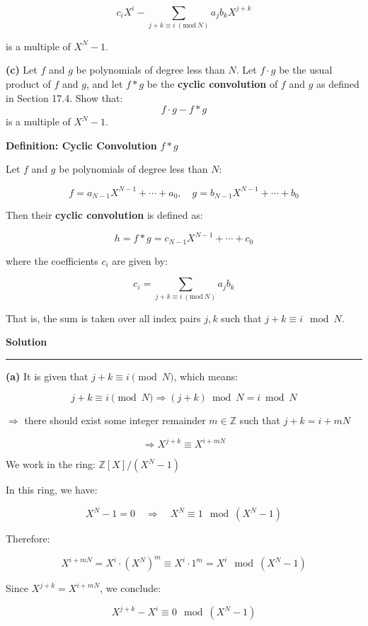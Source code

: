 \documentclass[a4paper,12pt]{article}
\begin{document}
\[
c_i X^i - \sum_{j + k \equiv i \ (\mathrm{mod}\ N)} a_j b_k X^{j + k}
\]

is a multiple of \(X^N - 1\).

\textbf{(c)} Let \(f\) and \(g\) be polynomials of degree less than
\(N\). Let \(f \cdot g\) be the usual product of \(f\) and \(g\), and
let \(f * g\) be the \textbf{cyclic convolution} of \(f\) and \(g\) as
defined in Section 17.4. Show that: \[
f \cdot g - f * g
\] is a multiple of \(X^N - 1\).

\textbf{Definition: Cyclic Convolution} \(f * g\)

Let \(f\) and \(g\) be polynomials of degree less than \(N\):

\[
f = a_{N-1} X^{N-1} + \cdots + a_0, \quad
g = b_{N-1} X^{N-1} + \cdots + b_0
\]

Then their \textbf{cyclic convolution} is defined as:

\[
h = f * g = c_{N-1} X^{N-1} + \cdots + c_0
\]

where the coefficients \(c_i\) are given by:

\[
c_i = \sum_{j + k \equiv i \ (\mathrm{mod}\ N)} a_j b_k
\]

That is, the sum is taken over all index pairs \(j, k\) such that
\(j + k \equiv i \mod N\).

    \textbf{Solution}

\begin{center}\rule{0.5\linewidth}{0.5pt}\end{center}

\textbf{(a)} It is given that \(j + k \equiv i \pmod{N}\), which means:

\[
j + k \equiv i \pmod{N}
\Rightarrow (j + k) \bmod N = i \bmod N
\]

\(\Rightarrow\) there should exist some integer remainder
\(m \in \mathbb{Z}\) such that \(j + k = i + mN\)

\[
\Rightarrow X^{j+k} \equiv X^{i+mN}
\]

We work in the ring: \(\mathbb{Z}[X] / (X^N - 1)\)

In this ring, we have:

\[
X^N - 1 = 0 \quad \Rightarrow \quad X^N \equiv 1 \mod (X^N - 1)
\]

Therefore:

\[
X^{i + mN} = X^i \cdot (X^N)^m \equiv X^i \cdot 1^m = X^i \mod (X^N - 1)
\]

Since \(X^{j+k} = X^{i + mN}\), we conclude:

\[
X^{j+k} - X^i \equiv 0 \mod (X^N - 1)
\]
\end{document}
